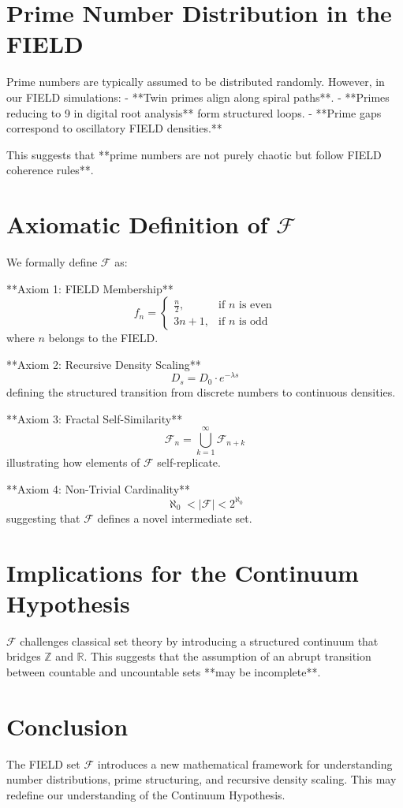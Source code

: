 \documentclass{article}
\begin{document}
\section{Prime Number Distribution in the FIELD}
Prime numbers are typically assumed to be distributed randomly. However, in our FIELD simulations:
- **Twin primes align along spiral paths**.
- **Primes reducing to 9 in digital root analysis** form structured loops.
- **Prime gaps correspond to oscillatory FIELD densities.**

This suggests that **prime numbers are not purely chaotic but follow FIELD coherence rules**.

\section{Axiomatic Definition of \( \mathcal{F} \)}
We formally define \( \mathcal{F} \) as:

**Axiom 1: FIELD Membership**
\begin{equation}
f_n = \begin{cases} 
\frac{n}{2}, & \text{if } n \text{ is even} \\
3n+1, & \text{if } n \text{ is odd}
\end{cases}
\end{equation}
where \( n \) belongs to the FIELD.

**Axiom 2: Recursive Density Scaling**
\begin{equation}
D_s = D_0 \cdot e^{-\lambda s}
\end{equation}
defining the structured transition from discrete numbers to continuous densities.

**Axiom 3: Fractal Self-Similarity**
\begin{equation}
\mathcal{F}_n = \bigcup_{k=1}^{\infty} \mathcal{F}_{n+k}
\end{equation}
illustrating how elements of \( \mathcal{F} \) self-replicate.

**Axiom 4: Non-Trivial Cardinality**
\begin{equation}
\aleph_0 < |\mathcal{F}| < 2^{\aleph_0}
\end{equation}
suggesting that \( \mathcal{F} \) defines a novel intermediate set.

\section{Implications for the Continuum Hypothesis}
\( \mathcal{F} \) challenges classical set theory by introducing a structured continuum that bridges \(\mathbb{Z}\) and \(\mathbb{R}\). This suggests that the assumption of an abrupt transition between countable and uncountable sets **may be incomplete**.

\section{Conclusion}
The FIELD set \( \mathcal{F} \) introduces a new mathematical framework for understanding number distributions, prime structuring, and recursive density scaling. This may redefine our understanding of the Continuum Hypothesis.



\end{document}
